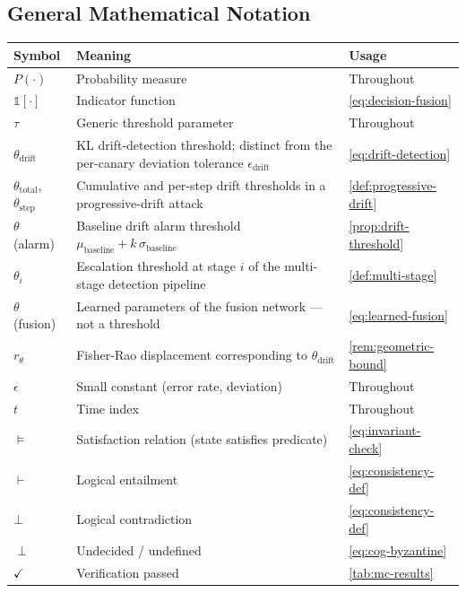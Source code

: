 \documentclass[
]{article}
\newcounter{none} %
\begin{document}
\subsection{General Mathematical
Notation}\label{general-mathematical-notation}

{\def\LTcaptype{none} %
\begin{longtable}[]{@{}
  >{\raggedright\arraybackslash}p{}
  >{\raggedright\arraybackslash}p{}
  >{\raggedright\arraybackslash}p{}@{}}
\toprule\noalign{}
\begin{minipage}[b]{\linewidth}\raggedright
Symbol
\end{minipage} & \begin{minipage}[b]{\linewidth}\raggedright
Meaning
\end{minipage} & \begin{minipage}[b]{\linewidth}\raggedright
Usage
\end{minipage} \\
\midrule\noalign{}
\endhead
\bottomrule\noalign{}
\endlastfoot
\(P(\cdot)\) & Probability measure & Throughout \\
\(\mathbb{1}[\cdot]\) & Indicator function &
\cref{eq:decision-fusion} \\
\(\tau\) & Generic threshold parameter & Throughout \\
\(\theta_{\text{drift}}\) & KL drift-detection threshold; distinct from
the per-canary deviation tolerance \(\epsilon_{\text{drift}}\) &
\cref{eq:drift-detection} \\
\(\theta_{\text{total}}\), \(\theta_{\text{step}}\) & Cumulative and
per-step drift thresholds in a progressive-drift attack &
\cref{def:progressive-drift} \\
\(\theta\) (alarm) & Baseline drift alarm threshold
\(\mu_{\text{baseline}} + k\,\sigma_{\text{baseline}}\) &
\cref{prop:drift-threshold} \\
\(\theta_i\) & Escalation threshold at stage \(i\) of the multi-stage
detection pipeline & \cref{def:multi-stage} \\
\(\theta\) (fusion) & Learned parameters of the fusion network --- not a
threshold & \cref{eq:learned-fusion} \\
\(r_\theta\) & Fisher-Rao displacement corresponding to
\(\theta_{\text{drift}}\) & \cref{rem:geometric-bound} \\
\(\epsilon\) & Small constant (error rate, deviation) & Throughout \\
\(t\) & Time index & Throughout \\
\(\models\) & Satisfaction relation (state satisfies predicate) &
\cref{eq:invariant-check} \\
\(\vdash\) & Logical entailment & \cref{eq:consistency-def} \\
\(\bot\) & Logical contradiction & \cref{eq:consistency-def} \\
\(\perp\) & Undecided / undefined & \cref{eq:cog-byzantine} \\
\(\checkmark\) & Verification passed & \cref{tab:mc-results} \\
\end{longtable}
}
\end{document}
